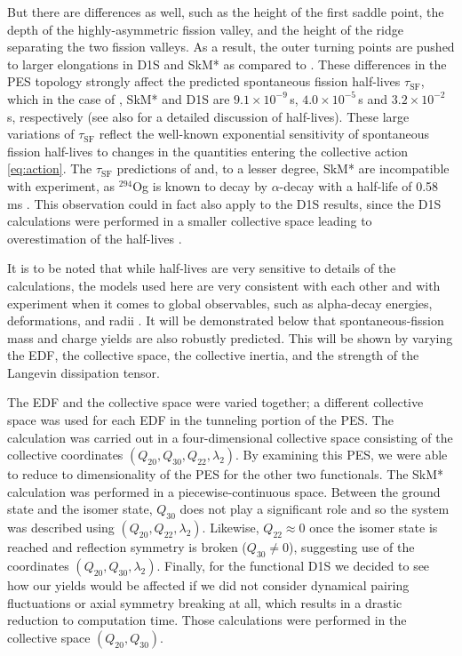 But there are differences as well, such as the height of the first saddle point, the depth of the highly-asymmetric fission valley, and the height of the ridge separating the two fission valleys. As a result, the outer turning points are pushed to larger elongations in D1S and SkM* as compared to \hfb{}. These differences in the PES topology strongly affect the predicted spontaneous fission half-lives $\tau_\mathrm{SF}$, which in the case of \hfb{}, SkM* and D1S are $9.1\times10^{-9}\,$s, $4.0\times10^{-5}\,$s and $3.2\times10^{-2}\,$s, respectively (see also \cite{Staszczak2013,Baran2015} for a detailed discussion of half-lives). These large variations of $\tau_\mathrm{SF}$ reflect the well-known exponential sensitivity of spontaneous fission half-lives to changes in the quantities entering the collective action \eqref{eq:action}. The $\tau_\mathrm{SF}$ predictions of \hfb{} and, to a lesser degree,  SkM* are incompatible with experiment, as $^{294}$Og  is known to  decay by $\alpha$-decay with a half-life of 0.58\,ms \cite{Brewer2018}. This observation could in fact also apply to the D1S results, since the D1S calculations were performed in a smaller collective space leading to overestimation of the half-lives \cite{Giuliani2014,Sadhukhan2014}.

It is to be noted that while half-lives are very sensitive to details of the calculations, the models used here are very consistent with each other and with experiment when it comes to global observables, such as alpha-decay energies, deformations, and radii \cite{Heenen2015,Giuliani2019}. It will be demonstrated below that spontaneous-fission mass and charge yields are also robustly predicted. This will be shown by varying the EDF, the collective space, the collective inertia, and the strength of the Langevin dissipation tensor.

The EDF and the collective space were varied together; a different collective space was used for each EDF in the tunneling portion of the PES. The {\hfb} calculation was carried out in a four-dimensional collective space consisting of the collective coordinates $(Q_{20}, Q_{30}, Q_{22}, \lambda_2)$. By examining this PES, we were able to reduce to dimensionality of the PES for the other two functionals. The SkM* calculation was performed in a piecewise-continuous space. Between the ground state and the isomer state, $Q_{30}$ does not play a significant role and so the system was described using  $(Q_{20}, Q_{22}, \lambda_2)$. Likewise, $Q_{22} \approx 0$ once the isomer state is reached and reflection symmetry is broken ($Q_{30} \neq 0$), suggesting use of the coordinates  $(Q_{20}, Q_{30}, \lambda_2)$. Finally, for the functional D1S we decided to see how our yields would be affected if we did not consider dynamical pairing fluctuations or axial symmetry breaking at all, which results in a drastic reduction to computation time. Those calculations were performed in the collective space $(Q_{20}, Q_{30})$.

